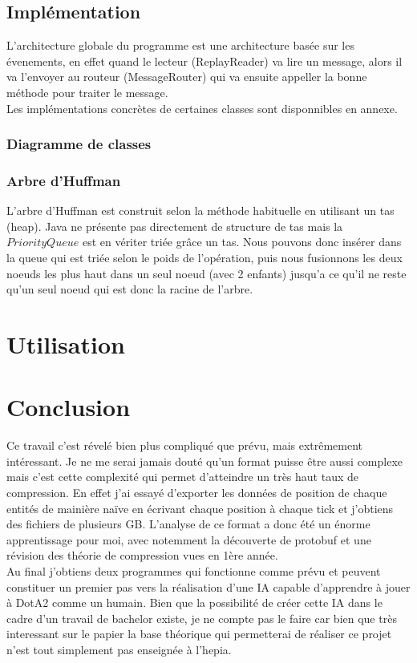 \documentclass{article}
\begin{document}
\subsection{Implémentation}

L'architecture globale du programme est une architecture basée sur les évenements, en effet quand le lecteur (ReplayReader) va lire un message, alors il va l'envoyer au routeur (MessageRouter) qui va ensuite appeller la bonne méthode pour traiter le message.\\

Les implémentations concrètes de certaines classes sont disponnibles en annexe.

\subsubsection{Diagramme de classes}

\subsubsection{Arbre d'Huffman}

L'arbre d'Huffman est construit selon la méthode habituelle en utilisant un tas (heap). Java ne présente pas directement de structure de tas mais la $PriorityQueue$ est en vériter triée grâce un tas. Nous pouvons donc insérer dans la queue qui est triée selon le poids de l'opération, puis nous fusionnons les deux noeuds les plus haut dans un seul noeud (avec 2 enfants) jusqu'a ce qu'il ne reste qu'un seul noeud qui est donc la racine de l'arbre.

\section{Utilisation}



\section{Conclusion}

Ce travail c'est révelé bien plus compliqué que prévu, mais extrêmement intéressant. Je ne me serai jamais douté qu'un format puisse être aussi complexe mais c'est cette complexité qui permet d'atteindre un très haut taux de compression. En effet j'ai essayé d'exporter les données de position de chaque entités de mainière naïve en écrivant chaque position à chaque tick et j'obtiens des fichiers de plusieurs GB. L'analyse de ce format a donc été un énorme apprentissage pour moi, avec notemment la découverte de protobuf et une révision des théorie de compression vues en 1ère année.\\
Au final j'obtiens deux programmes qui fonctionne comme prévu et peuvent constituer un premier pas vers la réalisation d'une IA capable d'apprendre à jouer à DotA2 comme un humain. Bien que la possibilité de créer cette IA dans le cadre d'un travail de bachelor existe, je ne compte pas le faire car bien que très interessant sur le papier la base théorique qui permetterai de réaliser ce projet n'est tout simplement pas enseignée à l'hepia.
\end{document}
